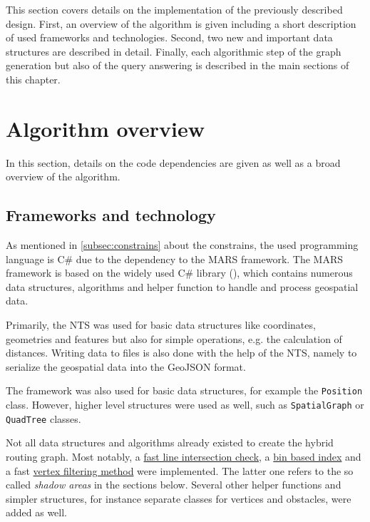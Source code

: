 
This section covers details on the implementation of the previously described design.
First, an overview of the algorithm is given including a short description of used frameworks and technologies.
Second, two new and important data structures are described in detail.
Finally, each algorithmic step of the graph generation but also of the query answering is described in the main sections of this chapter.

\section{Algorithm overview}

	In this section, details on the code dependencies are given as well as a broad overview of the algorithm.

	\subsection{Frameworks and technology}
	\label{subsec:frameworks-technology}
	
		As mentioned in \cref{subsec:constrains} about the constrains, the used programming language is C\# due to the dependency to the MARS framework.
		The MARS framework is based on the widely used C\# library  (), which contains numerous data structures, algorithms and helper function to handle and process geospatial data.
		
		Primarily, the NTS was used for basic data structures like coordinates, geometries and features but also for simple operations, e.g. the calculation of distances.
		Writing data to files is also done with the help of the NTS, namely to serialize the geospatial data into the GeoJSON format.
		
		The  framework was also used for basic data structures, for example the \texttt{Position} class.
		However, higher level structures were used as well, such as \texttt{SpatialGraph} or \texttt{QuadTree} classes.
		
		Not all data structures and algorithms already existed to create the hybrid routing graph.
		Most notably, a \hyperref[subsubsec:intersection-checks]{fast line intersection check}, a \hyperref[subsec:binindex]{bin based index} and a fast \hyperref[subsec:shadow-areas]{vertex filtering method} were implemented.
		The latter one refers to the so called \emph{shadow areas} in the sections below.
		Several other helper functions and simpler structures, for instance separate classes for vertices and obstacles, were added as well.
	
